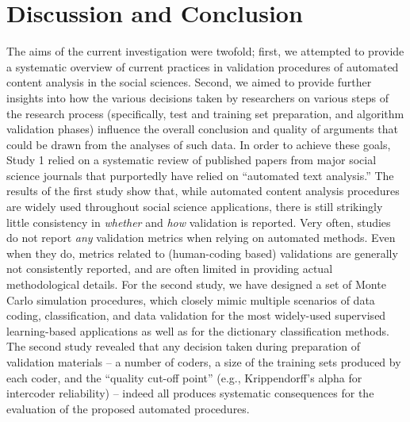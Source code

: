 \documentclass[man, 12pt, a4paper, nolmodern, noextraspace]{apa6}
\begin{document}
\section{Discussion and Conclusion}
    
    The aims of the current investigation were twofold; first, we attempted to provide a systematic overview of current practices in validation procedures of automated content analysis in the social sciences. Second, we aimed to provide further insights into how the various decisions taken by researchers on various steps of the research process (specifically, test and training set preparation, and algorithm validation phases) influence the overall conclusion and quality of arguments that could be drawn from the analyses of such data. In order to achieve these goals, Study 1 relied on a systematic review of published papers from major social science journals that purportedly have relied on \enquote{automated text analysis.} The results of the first study show that, while automated content analysis procedures are widely used throughout social science applications, there is still strikingly little consistency in \textit{whether} and \textit{how} validation is reported. Very often, studies do not report \textit{any} validation metrics when relying on automated methods. Even when they do, metrics related to (human-coding based) validations are generally not consistently reported, and are often limited in providing actual methodological details. For the second study, we have designed a set of Monte Carlo simulation procedures, which closely mimic multiple scenarios of data coding, classification, and data validation for the most widely-used supervised learning-based applications as well as for the dictionary classification methods. The second study revealed that any decision taken during preparation of validation materials -- a number of coders, a size of the training sets produced by each coder, and the \enquote{quality cut-off point} (e.g., Krippendorff's alpha for intercoder reliability) -- indeed all produces systematic consequences for the evaluation of the proposed automated procedures. 
\end{document}
